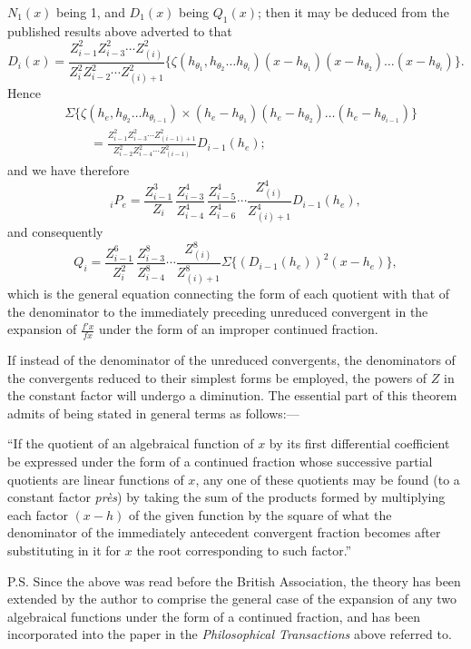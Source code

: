 \documentclass[11pt]{article}
\newcommand{\sourcepage}[1]{\marginpar{\scriptsize p.~#1}}
\begin{document}
{{\sourcepage{398}
$N_1(x)$ being 1, and $D_1(x)$ being $Q_1(x)$; then it may be deduced from the published results above adverted to that
\[
D_i(x)=
\frac{Z^2_{i-1}Z^2_{i-3}\cdots Z^2_{(i)}}{Z_i^2Z^2_{i-2}\cdots Z^2_{(i)+1}}
\{\zeta(h_{\theta_1},h_{\theta_2}\ldots h_{\theta_i})(x-h_{\theta_1})(x-h_{\theta_2})\ldots(x-h_{\theta_i})\}.
\]
Hence
\[
\begin{aligned}
&\Sigma\{\zeta(h_e,h_{\theta_2}\ldots h_{\theta_{i-1}})
\times(h_e-h_{\theta_1})(h_e-h_{\theta_2})\ldots(h_e-h_{\theta_{i-1}})\}\\
&\qquad =
\frac{Z^2_{i-1}Z^2_{i-3}\cdots Z^2_{(i-1)+1}}{Z^2_{i-2}Z^2_{i-4}\cdots Z^2_{(i-1)}}
D_{i-1}(h_e);
\end{aligned}
\]
and we have therefore
\[
{}_iP_e=
\frac{Z^3_{i-1}}{Z_i}\,
\frac{Z^4_{i-3}}{Z^4_{i-4}}\,
\frac{Z^4_{i-5}}{Z^4_{i-6}}\cdots
\frac{Z^4_{(i)}}{Z^4_{(i)+1}}
D_{i-1}(h_e),
\]
and consequently
\[
Q_i=
\frac{Z^6_{i-1}}{Z_i^2}\,
\frac{Z^8_{i-3}}{Z^8_{i-4}}\cdots
\frac{Z^8_{(i)}}{Z^8_{(i)+1}}
\Sigma\{(D_{i-1}(h_e))^2(x-h_e)\},
\]
which is the general equation connecting the form of each quotient with that of the denominator to the immediately preceding unreduced convergent in the expansion of $\frac{f'x}{fx}$ under the form of an improper continued fraction.

If instead of the denominator of the unreduced convergents, the denominators of the convergents reduced to their simplest forms be employed, the powers of $Z$ in the constant factor will undergo a diminution. The essential part of this theorem admits of being stated in general terms as follows:---

``If the quotient of an algebraical function of $x$ by its first differential coefficient be expressed under the form of a continued fraction whose successive partial quotients are linear functions of $x$, any one of these quotients may be found (to a constant factor \emph{près}) by taking the sum of the products formed by multiplying each factor $(x-h)$ of the given function by the square of what the denominator of the immediately antecedent convergent fraction becomes after substituting in it for $x$ the root corresponding to such factor.''

P.S. Since the above was read before the British Association, the theory has been extended by the author to comprise the general case of the expansion of any two algebraical functions under the form of a continued fraction, and has been incorporated into the paper in the \emph{Philosophical Transactions} above referred to.

}}
\end{document}

